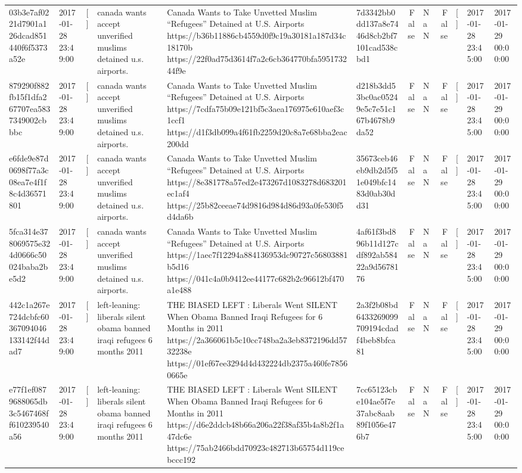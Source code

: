 \begin{tabular}{llllllrlrlll}
03b3e7af0221d7901a126dcad851440f6f5373a52e & 2017-01-28 23:49:00 & [] & canada wants accept unverified muslims detained u.s. airports. & Canada Wants to Take Unvetted Muslim “Refugees” Detained at U.S. Airports https://b36b11886cb4559d0f9c19a30181a187d34c18170b https://22f0ad75d3614f7a2c6cb364770bfa595173244f9e & 7d3342bb0dd137a8e7446d8cb2bf7101cad538cbd1 & False & NaN & False & [] & 2017-01-28 23:45:00 & 2017-01-29 00:00:00 \\
879290f882fb15f1dfa267707ea5837349002cbbbc & 2017-01-28 23:49:00 & [] & canada wants accept unverified muslims detained u.s. airports. & Canada Wants to Take Unvetted Muslim “Refugees” Detained at U.S. Airports https://7cdfa75b09e121bf5c3aea176975e610aef3c1ccf1 https://d1f3db099a4f61fb2259d20c8a7e68bba2eac200dd & d218b3dd53bc0ac05249e5c7e51c167b4678b9da52 & False & NaN & False & [] & 2017-01-28 23:45:00 & 2017-01-29 00:00:00 \\
e6fde9e87d0698f77a3c08ea7e4f1f8c4d36571801 & 2017-01-28 23:49:00 & [] & canada wants accept unverified muslims detained u.s. airports. & Canada Wants to Take Unvetted Muslim “Refugees” Detained at U.S. Airports https://8e381778a57ed2e473267d1083278d683201ec1af4 https://25b82ceeae74d9816d984d86d93a0fe530f5d4da6b & 35673ceb46eb9db2d5f51e049bfc1483d0ab30dd31 & False & NaN & False & [] & 2017-01-28 23:45:00 & 2017-01-29 00:00:00 \\
5fca314e378069575e324d0666c50024baba2be5d2 & 2017-01-28 23:49:00 & [] & canada wants accept unverified muslims detained u.s. airports. & Canada Wants to Take Unvetted Muslim “Refugees” Detained at U.S. Airports https://1aec7f12294a884136953dc90727c56803881b5d16 https://041c4a0b9412ee44177c682b2c96612bf470a1e488 & 4af61f3bd896b11d127cdf892ab58422a9d5678176 & False & NaN & False & [] & 2017-01-28 23:45:00 & 2017-01-29 00:00:00 \\
442c1a267e724dcbfc60367094046133142f44dad7 & 2017-01-28 23:49:00 & [] & left-leaning: liberals silent obama banned iraqi refugees 6 months 2011 & THE BIASED LEFT : Liberals Went SILENT When Obama Banned Iraqi Refugees for 6 Months in 2011 https://2a366061b5c10cc748ba2a3eb8372196dd5732238e https://01ef67ee3294d4d432224db2375a460fe78560665e & 2a3f2b08bd6433269099709194cdadf4beb8bfca81 & False & NaN & False & [] & 2017-01-28 23:45:00 & 2017-01-29 00:00:00 \\
e77f1ef0879688065db3c5467468ff610239540a56 & 2017-01-28 23:49:00 & [] & left-leaning: liberals silent obama banned iraqi refugees 6 months 2011 & THE BIASED LEFT : Liberals Went SILENT When Obama Banned Iraqi Refugees for 6 Months in 2011 https://d6e2ddcb48b66a206a22f38af35b4a8b2f1a47dc6e https://75ab2466bdd70923c482713b65754d119cebccc192 & 7cc65123cbe104ae5f7e37abc8aab89f1056e476b7 & False & NaN & False & [] & 2017-01-28 23:45:00 & 2017-01-29 00:00:00 \\

\end{tabular}
